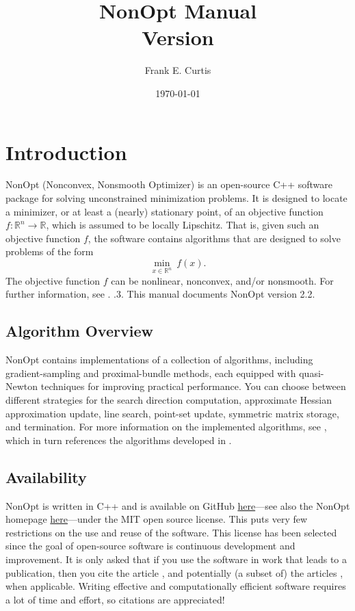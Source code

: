 \documentclass{article}
\title{NonOpt Manual \\ \large Version \nonoptversion}
\author{Frank E. Curtis}
\date{\today}
\newcommand{\nonoptversion}{2.2}
\begin{document}
\maketitle
\tableofcontents

\section{Introduction}

NonOpt (Nonconvex, Nonsmooth Optimizer) is an open-source C++ software package for solving unconstrained minimization problems.  It is designed to locate a minimizer, or at least a (nearly) stationary point, of an objective function $f : \mathbb{R}^n \to \mathbb{R}{}$, which is assumed to be locally Lipschitz.  That is, given such an objective function $f$, the software contains algorithms that are designed to solve problems of the form
\begin{equation*}
  \min_{x \in \mathbb{R}^n}\ f(x).
\end{equation*}
The objective function $f$ can be nonlinear, nonconvex, and/or nonsmooth.  For further information, see \cite{CurtZebi2026}. .3.
This manual documents NonOpt version \nonoptversion.

\subsection{Algorithm Overview}

NonOpt contains implementations of a collection of algorithms, including gradient-sampling and proximal-bundle methods, each equipped with quasi-Newton techniques for improving practical performance.  You can choose between different strategies for the search direction computation, approximate Hessian approximation update, line search, point-set update, symmetric matrix storage, and termination.  For more information on the implemented algorithms, see \cite{CurtZebi2026}, which in turn references the algorithms developed in \cite{CurtLi22,CurtQue13,CurtQue15,CurtRobiZhou20}.

\subsection{Availability}

NonOpt is written in C++ and is available on GitHub \href{https://github.com/frankecurtis/NonOpt}{here}---see also the NonOpt homepage \href{https://frankecurtis.github.io/NonOpt/}{here}---under the MIT open source license. This puts very few restrictions on the use and reuse of the software. This license has been selected since the goal of open-source software is continuous development and improvement.  It is only asked that if you use the software in work that leads to a publication, then you cite the article \cite{CurtZebi2026}, and potentially (a subset of) the articles \cite{CurtLi22,CurtQue13,CurtQue15,CurtRobiZhou20}, when applicable.  Writing effective and computationally efficient software requires a lot of time and effort, so citations are appreciated!
\end{document}
